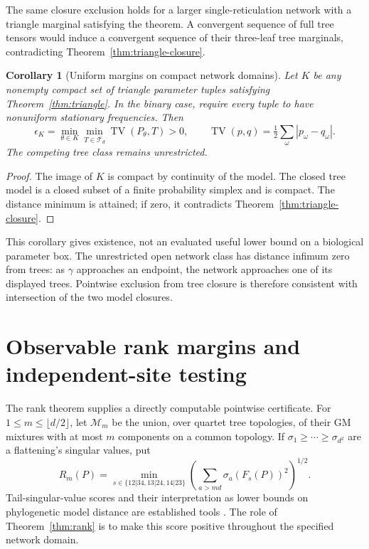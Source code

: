 \documentclass[11pt]{article}
\newtheorem{corollary}[theorem]{Corollary}
\theoremstyle{definition}
\theoremstyle{remark}
\DeclareMathOperator{\TV}{TV}
\begin{document}
The same closure exclusion holds for a larger single-reticulation network
with a triangle marginal satisfying the theorem. A convergent sequence of
full tree tensors would induce a convergent sequence of their three-leaf
tree marginals, contradicting Theorem~\ref{thm:triangle-closure}.

\begin{corollary}[Uniform margins on compact network domains]
\label{cor:compact}
Let $K$ be any nonempty compact set of triangle parameter tuples satisfying
Theorem~\ref{thm:triangle}. In the binary case, require every tuple to have
nonuniform stationary frequencies. Then
\[
 \epsilon_K=\min_{\theta\in K}\min_{T\in\overline{\mathcal T_d}}
                \TV(P_\theta,T)>0,
 \qquad \TV(p,q)=\tfrac12\sum_\omega|p_\omega-q_\omega|.
\]
The competing tree class remains unrestricted.
\end{corollary}
\begin{proof}
The image of $K$ is compact by continuity of the model. The closed tree
model is a closed subset of a finite probability simplex and is compact.
The distance minimum is attained; if zero, it contradicts
Theorem~\ref{thm:triangle-closure}.
\end{proof}

This corollary gives existence, not an evaluated useful lower bound on a
biological parameter box. The unrestricted open network class has distance
infimum zero from trees: as $\gamma$ approaches an endpoint, the network
approaches one of its displayed trees. Pointwise exclusion from tree
closure is therefore consistent with intersection of the two model
closures.

\section{Observable rank margins and independent-site testing}
\label{sec:statistics}

The rank theorem supplies a directly computable pointwise certificate.
For $1\le m\le\lfloor d/2\rfloor$, let $\mathcal M_m$ be the union,
over quartet tree topologies, of their GM mixtures with at most $m$
components on a common topology. If
$\sigma_1\ge\cdots\ge\sigma_{d^2}$ are a flattening's singular values,
put
\begin{equation}\label{eq:rank-residual}
 R_m(P)=\min_{s\in\{12|34,13|24,14|23\}}
       \left(\sum_{a>md}\sigma_a(F_s(P))^2\right)^{1/2}.
\end{equation}
Tail-singular-value scores and their interpretation as lower bounds on
phylogenetic model distance are established tools
\cite{EckartYoung1936,LongKubatko2021}. The role of
Theorem~\ref{thm:rank} is to make this score positive throughout the
specified network domain.
\end{document}
